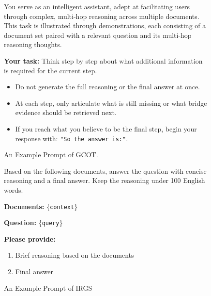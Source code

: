 \documentclass{article} %
\begin{document}
\begin{figure}[!b]
\begin{tcolorbox}[mybox={Prompts}]
You serve as an intelligent assistant, adept at facilitating users through complex, multi-hop reasoning across multiple documents.  
This task is illustrated through demonstrations, each consisting of a document set paired with a relevant question and its multi-hop reasoning thoughts.

\textbf{Your task:}  
Think step by step about what additional information is required for the current step.  
\begin{itemize}
  \item Do not generate the full reasoning or the final answer at once.  
  \item At each step, only articulate what is still missing or what bridge evidence should be retrieved next.  
  \item If you reach what you believe to be the final step, begin your response with: \texttt{"So the answer is:"}.  
\end{itemize}
\end{tcolorbox}
\caption{An Example Prompt of GCOT.}
\label{fig:GCOT}
\end{figure}

\begin{figure}[!b]
\begin{tcolorbox}[mybox={Prompts}]
Based on the following documents, answer the question with concise reasoning and a final answer.  
Keep the reasoning under 100 English words.

\textbf{Documents:}  
\{\texttt{context}\}  

\textbf{Question:}  
\{\texttt{query}\}  

\textbf{Please provide:}
\begin{enumerate}
  \item Brief reasoning based on the documents  
  \item Final answer  
\end{enumerate}
\end{tcolorbox}
\caption{An Example Prompt of IRGS}
\label{fig:IRGS}
\end{figure}
\end{document}
